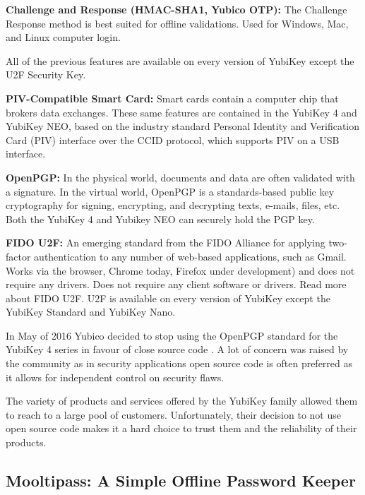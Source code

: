 \textbf{Challenge and Response (HMAC-SHA1, Yubico OTP): }
The Challenge Response method is best suited for offline validations. Used for Windows, Mac, and Linux computer login.

\vspace{10pt}

All of the previous features are available on every version of YubiKey except the U2F Security Key.

\textbf{PIV-Compatible Smart Card: }
Smart cards contain a computer chip that brokers data exchanges. These same features are contained in the YubiKey 4 and YubiKey NEO, based on the industry standard Personal Identity and Verification Card (PIV) interface over the CCID protocol, which supports PIV on a USB interface.

\textbf{OpenPGP: }
In the physical world, documents and data are often validated with a signature. In the virtual world, OpenPGP is a standards-based public key cryptography for signing, encrypting, and decrypting texts, e-mails, files, etc. Both the YubiKey 4 and Yubikey NEO can securely hold the PGP key.

\textbf{FIDO U2F: }
An emerging standard from the FIDO Alliance for applying two-factor authentication to any number of web-based applications, such as Gmail. Works via the browser, Chrome today, Firefox under development) and does not require any drivers. Does not require any client software or drivers. Read more about FIDO U2F.  U2F is available on every version of YubiKey except the YubiKey Standard and YubiKey Nano.

\vspace{10pt}


In May of 2016 Yubico decided to stop using the OpenPGP standard for the YubiKey 4 series in favour of close source code \cite{yubiopen}. A lot of concern was raised by the community as in security applications open source code is often preferred as it allows for independent control on security flaws.

The variety of products and services offered by the YubiKey family allowed them to reach to a large pool of customers. Unfortunately, their decision to not use open source code makes it a hard choice to trust them and the reliability of their products.


\subsection{Mooltipass: A Simple Offline Password Keeper} 

